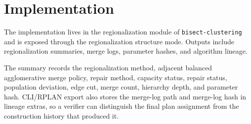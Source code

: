 \section{Implementation}

The implementation lives in the regionalization module of
\texttt{bisect-clustering} and is exposed through the regionalization structure
mode. Outputs include regionalization summaries, merge logs, parameter hashes,
and algorithm lineage.

The summary records the regionalization method, adjacent balanced
agglomerative merge policy, repair method, capacity status, repair status,
population deviation, edge cut, merge count, hierarchy depth, and parameter
hash. CLI/RPLAN export also stores the merge-log path and merge-log hash in
lineage extras, so a verifier can distinguish the final plan assignment from
the construction history that produced it.
